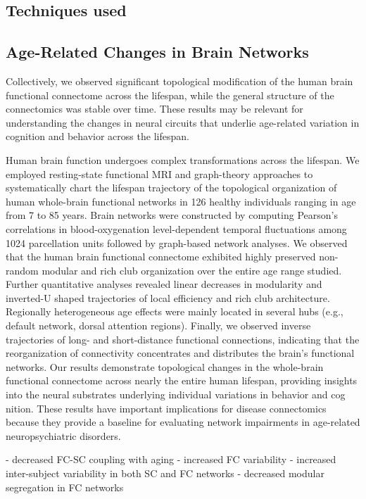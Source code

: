 \subsection{Techniques used}


\subsection{Age-Related Changes in Brain Networks}

Collectively, we observed significant topological modification of 
the human brain functional connectome
across the lifespan, while the general structure of the connectomics 
was stable over time. These results may be
relevant for understanding the changes in neural circuits
that underlie age-related variation in cognition and behavior across 
the lifespan. 
\cite{Cao2014}


Human brain function undergoes complex transformations across the lifespan. We
employed resting-state functional MRI and graph-theory approaches to systematically
chart the lifespan trajectory of the topological organization of human whole-brain 
functional networks in 126 healthy individuals ranging in age from 7 to 85 years. Brain
networks were constructed by computing Pearson’s correlations in blood-oxygenation
level-dependent temporal fluctuations among 1024 parcellation units followed by
graph-based network analyses. We observed that the human brain functional connectome
exhibited highly preserved non-random modular and rich club organization over the entire
age range studied. Further quantitative analyses revealed linear decreases in modularity
and inverted-U shaped trajectories of local efficiency and rich club architecture. Regionally
heterogeneous age effects were mainly located in several hubs (e.g., default network, dorsal
attention regions). Finally, we observed inverse trajectories of long- and short-distance
functional connections, indicating that the reorganization of connectivity concentrates and
distributes the brain’s functional networks. Our results demonstrate topological changes in
the whole-brain functional connectome across nearly the entire human lifespan, providing
insights into the neural substrates underlying individual variations in behavior and cog
nition. These results have important implications for disease connectomics because they
provide a baseline for evaluating network impairments in age-related neuropsychiatric
disorders.
\cite{Cao2014}



- decreased FC-SC coupling with aging 
- increased FC variability
- increased inter-subject variability in both SC and FC networks
- decreased modular segregation in FC networks

